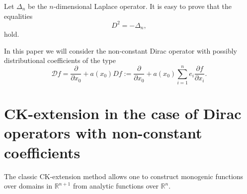 \documentclass[12pt]{amsart}
\theoremstyle{definition}
\newcommand{\R}{\mathbb{R}}
\begin{document}
Let $\Delta_{n}$ be the $n$-dimensional Laplace operator. It is easy to prove that the equalities
\begin{equation}\label{Fac Lap}
D^2=-\Delta_{n},
\end{equation}
hold.

In this paper we will consider the non-constant Dirac operator with possibly distributional coefficients of the type
$$
\mathcal{D}f=\frac{\partial}{\partial x_0}+a(x_0)Df :=\frac{\partial}{\partial x_0}+a(x_0)\sum_{i=1}^n e_i\frac{\partial f}{\partial x_i}.
$$

\section{CK-extension in the case of Dirac operators with non-constant coefficients}

The classic CK-extension method allows one to construct monogenic functions over domains in $\R^{n+1}$ from analytic functions over $\R^n$. 
\end{document}
